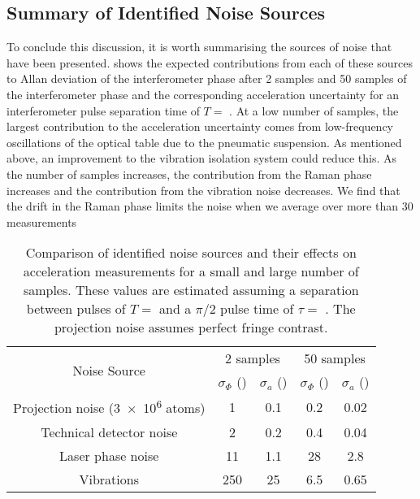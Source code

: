 \subsection{Summary of Identified Noise Sources}\label{subsec:noise_sources}
To conclude this discussion, it is worth summarising the
sources of noise that have been presented. 
 shows the expected contributions from
each of these sources to Allan deviation of the interferometer phase after 2 samples and 50
samples of the
interferometer phase and the corresponding acceleration uncertainty
for an interferometer pulse separation time of $T =$
. At a low number of samples, the largest
contribution to the acceleration uncertainty comes from low-frequency
oscillations of the optical table due to the pneumatic suspension. As mentioned above, an improvement to the
vibration isolation system could reduce this. As the
number of samples increases, the contribution from the Raman phase
increases and the contribution from the vibration noise decreases.
We find that the drift
in the Raman phase limits the noise
when we average over more than 30 measurements
\begin{table}[htpb!]
  \centering
  \begin{tabular}{ccccc}
    \toprule
    \multirow{2}{}{Noise Source}  & \multicolumn{2}{c}{2 samples} &
    \multicolumn{2}{c}{50 samples} \\
                                  & $\sigma_{\Phi}$  (\sivalue{}{\milli\radian})  &\(\sigma_a\)
    (\sivalue{}{\micro\meter\per\s\squared}) &
    $\sigma_{\Phi}$  (\sivalue{}{\milli\radian})&\(\sigma_a\)
    (\sivalue{}{\micro\meter\per\s\squared})\\
    \midrule
    Projection noise (\num{3e6} atoms) & 1 & 0.1 & 0.2& 0.02 \\
    Technical detector noise & 2 & 0.2 & 0.4 & 0.04\\
    Laser phase noise  & 11 & 1.1 & 28 & 2.8\\
    Vibrations & 250 & 25 & 6.5 & 0.65\\
    \bottomrule
  \end{tabular}
  \caption[Comparison of known noise sources.]{Comparison of
    identified noise sources and their effects on
  acceleration measurements for a small and large number of samples. These values are estimated assuming a
separation between pulses of \(T = \)  and a \(\pi/2\)
pulse time of \(\tau = \) . The projection noise
assumes perfect fringe contrast.}
  \label{tab:noise_sources}
\end{table}
